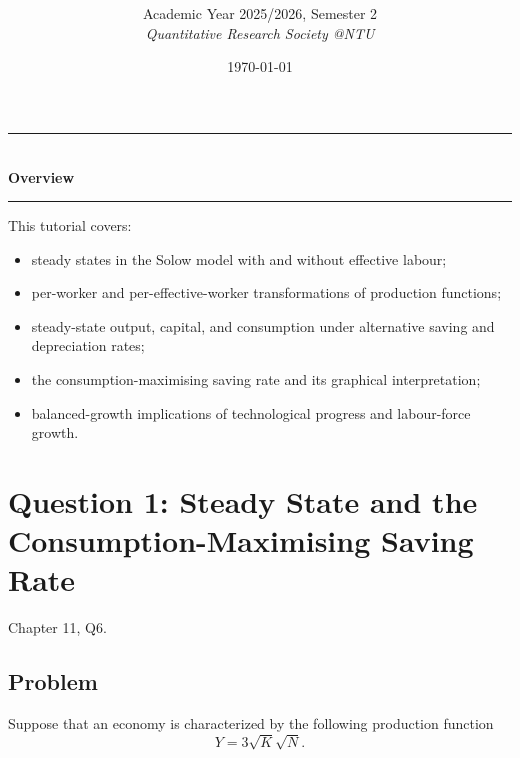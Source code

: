 \documentclass[12pt]{article}
\title{
\CourseCode \CourseName \\[0.3em]
\large \DocType
}
\author{
  Academic Year 2025/2026, Semester 2 \\[0.25em]
  \textit{Quantitative Research Society @NTU}
}
\date{\today}
\begin{document}
\maketitle
\thispagestyle{plainfirst}
\pagestyle{main}
\bigskip

\begin{center}
  \rule{0.8\textwidth}{0.4pt}\\[4pt]
  \textbf{Overview}\\[2pt]
  \rule{0.8\textwidth}{0.4pt}
\end{center}

\noindent
This tutorial covers:
\begin{itemize}[leftmargin=*]
  \item steady states in the Solow model with and without effective labour;
  \item per-worker and per-effective-worker transformations of production functions;
  \item steady-state output, capital, and consumption under alternative saving and depreciation rates;
  \item the consumption-maximising saving rate and its graphical interpretation;
  \item balanced-growth implications of technological progress and labour-force growth.
\end{itemize}

\bigskip

\newpage
\tableofcontents

\newpage
\section{Question 1: Steady State and the Consumption-Maximising Saving Rate}

\noindent
Chapter 11, Q6.

\subsection{Problem}
Suppose that an economy is characterized by the following production function
\[
Y = 3\sqrt{K}\sqrt{N}.
\]
\end{document}
